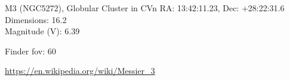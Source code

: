 \begin{block}{M3 (NGC5272), Globular Cluster in CVn}
    RA: 13:42:11.23, Dec: +28:22:31.6 \\ 
    Dimensions: 16.2 \\ 
    Magnitude (V): 6.39



    Finder fov: 60 

    \url{https://en.wikipedia.org/wiki/Messier_3} 
\end{block}